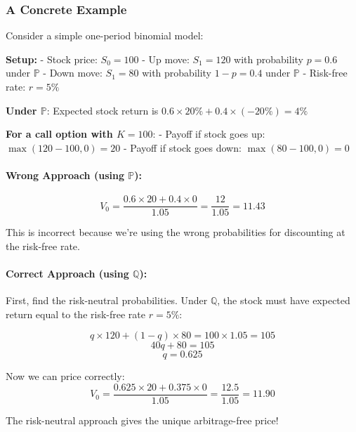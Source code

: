 \documentclass[
  letterpaper,
  DIV=11,
  numbers=noendperiod]{scrartcl}
\let\oldparagraph\paragraph
\renewcommand{\paragraph}[1]{\oldparagraph{#1}\mbox{}}
\begin{document}
\begin{tcolorbox}
\hypertarget{a-concrete-example}{%
\subsubsection{A Concrete Example}\label{a-concrete-example}}

Consider a simple one-period binomial model:

\textbf{Setup:} - Stock price: \(S_0 = 100\) - Up move: \(S_1 = 120\)
with probability \(p = 0.6\) under \(\mathbb{P}\) - Down move:
\(S_1 = 80\) with probability \(1-p = 0.4\) under \(\mathbb{P}\) -
Risk-free rate: \(r = 5\%\)

\textbf{Under \(\mathbb{P}\)}: Expected stock return is
\(0.6 \times 20\% + 0.4 \times (-20\%) = 4\%\)

\textbf{For a call option with \(K = 100\)}: - Payoff if stock goes up:
\(\max(120-100, 0) = 20\) - Payoff if stock goes down:
\(\max(80-100, 0) = 0\)

\hypertarget{wrong-approach-using-mathbbp}{%
\paragraph{\texorpdfstring{Wrong Approach (using
\(\mathbb{P}\)):}{Wrong Approach (using \textbackslash mathbb\{P\}):}}\label{wrong-approach-using-mathbbp}}

\[V_0 = \frac{0.6 \times 20 + 0.4 \times 0}{1.05} = \frac{12}{1.05} = 11.43\]

This is incorrect because we're using the wrong probabilities for
discounting at the risk-free rate.

\hypertarget{correct-approach-using-mathbbq}{%
\paragraph{\texorpdfstring{Correct Approach (using
\(\mathbb{Q}\)):}{Correct Approach (using \textbackslash mathbb\{Q\}):}}\label{correct-approach-using-mathbbq}}

First, find the risk-neutral probabilities. Under \(\mathbb{Q}\), the
stock must have expected return equal to the risk-free rate \(r = 5\%\):

\[q \times 120 + (1-q) \times 80 = 100 \times 1.05 = 105\]
\[40q + 80 = 105\] \[q = 0.625\]

Now we can price correctly:
\[V_0 = \frac{0.625 \times 20 + 0.375 \times 0}{1.05} = \frac{12.5}{1.05} = 11.90\]

The risk-neutral approach gives the unique arbitrage-free price!


\end{tcolorbox}
\end{document}
